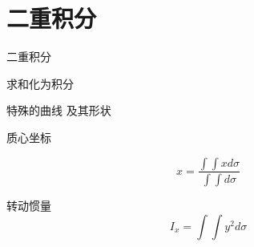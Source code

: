 \chapter{二重积分}

二重积分

求和化为积分

特殊的曲线
及其形状

质心坐标

$$x =\frac{\int\int x d\sigma}{\int \int d\sigma} $$

转动惯量
$$ I_x = \int\int y^2 d\sigma $$

